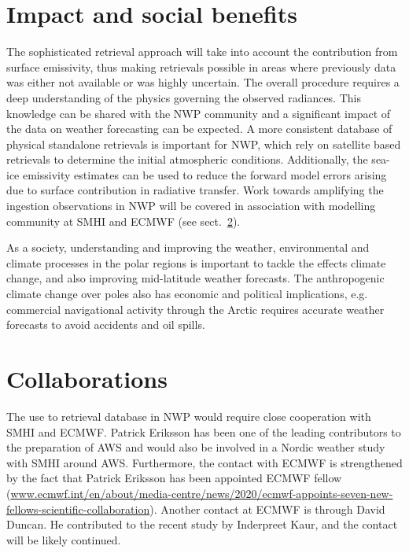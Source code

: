 \documentclass[12pt,oneside,a4paper]{article}
\begin{document}
\section{Impact and social benefits}
%
\label{sec:impact}

The sophisticated retrieval approach will take into account the contribution from surface emissivity, thus making retrievals possible in areas where previously data was either not available or was highly uncertain. The overall procedure requires a deep understanding of the physics governing the observed radiances. This knowledge can be shared with the NWP community and a significant impact of the data on weather forecasting can be expected. A more consistent database of physical standalone retrievals is important for NWP, which rely on satellite based retrievals to determine the initial atmospheric conditions. Additionally, the sea-ice emissivity estimates can be used to reduce the forward model errors arising due to surface contribution in radiative transfer. Work towards amplifying the ingestion observations in NWP will be covered in association with modelling community at SMHI and ECMWF (see sect.~\ref{sec:collaborations}). 

As a society, understanding and improving the weather, environmental and climate processes in the polar regions is important to tackle the effects climate change, and also improving mid-latitude weather forecasts. The anthropogenic climate change over poles also has economic and political implications, e.g.\, commercial navigational activity through the Arctic requires accurate weather forecasts to avoid accidents and oil spills. 

\section{Collaborations}
%
\label{sec:collaborations}
The use to retrieval database in NWP would require close cooperation with SMHI and ECMWF. Patrick Eriksson has been one of the leading contributors to the preparation of AWS and would also be involved in a Nordic weather study with SMHI around AWS. Furthermore, the contact with ECMWF is strengthened by the fact that Patrick Eriksson has been appointed ECMWF  fellow ({\footnotesize \url{www.ecmwf.int/en/about/media-centre/news/2020/ecmwf-appoints-seven-new-fellows-scientific-collaboration}}). Another contact at ECMWF is through David Duncan. He contributed to the recent study by Inderpreet Kaur, and the contact will be likely continued. 
\end{document}
